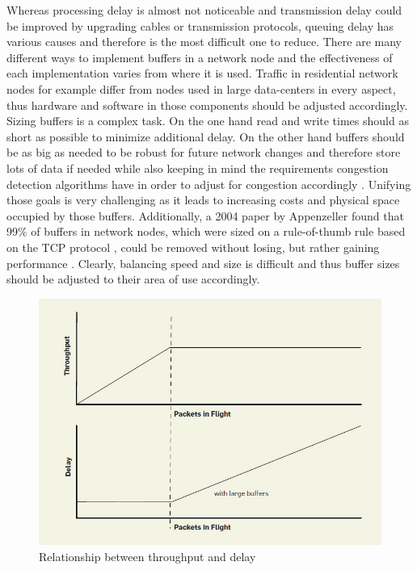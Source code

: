 \documentclass[a4paper,conference]{IEEEtran}
\begin{document}
Whereas processing delay is almost not noticeable and transmission delay could be improved by upgrading cables or transmission protocols, queuing delay has various causes and therefore is the  most difficult one to reduce. There are many different ways to implement buffers in a network node and the effectiveness of each implementation varies from where it is used. Traffic in residential network nodes for example differ from nodes used in large data-centers in every aspect, thus hardware and software in those components should be adjusted accordingly.
\\Sizing buffers is a complex task. On the one hand read and write times should as short as possible to minimize additional delay. On the other hand buffers should be as big as needed to be robust for future network changes and therefore store lots of data if needed while also keeping in mind the requirements congestion detection algorithms have in order to adjust for congestion accordingly \cite{staff2012bufferbloat}. Unifying those goals is very challenging as it leads to increasing costs and physical space occupied by those buffers. Additionally, a 2004 paper by Appenzeller found that 99\% of buffers in network nodes, which were sized on a rule-of-thumb rule based on the TCP protocol \cite{villamizar1994high}, could be removed without losing, but rather gaining performance \cite{appenzeller2004sizing}. Clearly, balancing speed and size is difficult and thus buffer sizes should be adjusted to their area of use accordingly.
\begin{figure}
  \centering
    \includegraphics[width=0.9\linewidth]{figures/Throughput-Delay}
  \caption{Relationship between throughput and delay \cite{gettys2012bufferbloat}}
  \label{fig:throughput-delay-relationship}
\end{figure}
\end{document}
